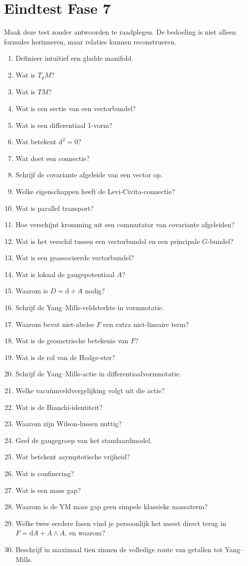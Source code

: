 \documentclass[11pt,a4paper]{article}
\newcommand{\dd}{\mathrm{d}}
\begin{document}
\section{Eindtest Fase 7}

Maak deze test zonder antwoorden te raadplegen. De bedoeling is niet alleen formules herinneren, maar relaties kunnen reconstrueren.

\begin{enumerate}
\item Definieer intuïtief een gladde manifold.
\item Wat is $T_pM$?
\item Wat is $TM$?
\item Wat is een sectie van een vectorbundel?
\item Wat is een differentiaal 1-vorm?
\item Wat betekent $\dd^2=0$?
\item Wat doet een connectie?
\item Schrijf de covariante afgeleide van een vector op.
\item Welke eigenschappen heeft de Levi-Civita-connectie?
\item Wat is parallel transport?
\item Hoe verschijnt kromming uit een commutator van covariante afgeleiden?
\item Wat is het verschil tussen een vectorbundel en een principale $G$-bundel?
\item Wat is een geassocieerde vectorbundel?
\item Wat is lokaal de gaugepotentiaal $A$?
\item Waarom is $D=\dd+A$ nodig?
\item Schrijf de Yang--Mills-veldsterkte in vormnotatie.
\item Waarom bevat niet-abelse $F$ een extra niet-lineaire term?
\item Wat is de geometrische betekenis van $F$?
\item Wat is de rol van de Hodge-ster?
\item Schrijf de Yang--Mills-actie in differentiaalvormnotatie.
\item Welke vacuümveldvergelijking volgt uit die actie?
\item Wat is de Bianchi-identiteit?
\item Waarom zijn Wilson-lussen nuttig?
\item Geef de gaugegroep van het standaardmodel.
\item Wat betekent asymptotische vrijheid?
\item Wat is confinering?
\item Wat is een mass gap?
\item Waarom is de YM mass gap geen simpele klassieke massaterm?
\item Welke twee eerdere fasen vind je persoonlijk het meest direct terug in $F=\dd A+A\wedge A$, en waarom?
\item Beschrijf in maximaal tien zinnen de volledige route van getallen tot Yang--Mills.
\end{enumerate}
\end{document}
